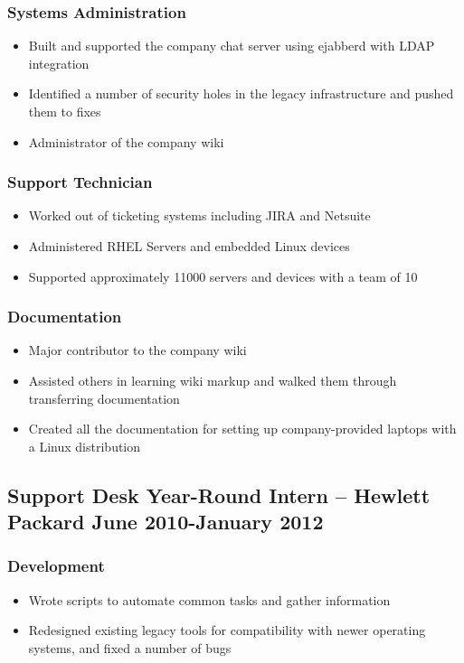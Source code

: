 \documentclass[10pt]{article}
\begin{document}
\subsubsection*{Systems Administration}
\begin{itemize}
    \item Built and supported the company chat server using ejabberd with LDAP integration
    \item Identified a number of security holes in the legacy infrastructure and pushed them to fixes
    \item Administrator of the company wiki
\end{itemize}

\subsubsection*{Support Technician}
\begin{itemize}
    \item Worked out of ticketing systems including JIRA and Netsuite
    \item Administered RHEL Servers and embedded Linux devices
    \item Supported approximately 11000 servers and devices with a team of 10
\end{itemize}

\subsubsection*{Documentation}
\begin{itemize}
    \item Major contributor to the company wiki
    \item Assisted others in learning wiki markup and walked them through transferring documentation
    \item Created all the documentation for setting up company-provided laptops with a Linux distribution
\end{itemize}

\subsection*{Support Desk Year-Round Intern -- Hewlett Packard  \hfill June 2010-January 2012}
\subsubsection*{Development}
\begin{itemize}
    \item Wrote scripts to automate common tasks and gather information
    \item Redesigned existing legacy tools for compatibility with newer operating systems, and fixed a number of bugs
\end{itemize}
\end{document}
